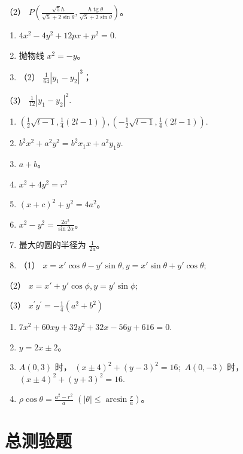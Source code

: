 （2）
\(P\left(\frac{\sqrt{5} h}{\sqrt{5} + 2\sin\theta}, \frac{h \operatorname{tg}\theta}{\sqrt{5} + 2\sin\theta}\right)\)。

\begin{enumerate}
\def\labelenumi{\arabic{enumi}.}
\setcounter{enumi}{5}
\item
  \(4x^{2} - 4y^{2} + 12px + p^{2} = 0.\)
\item
  抛物线 \(x^{2} = -y\)。
\item
  （2） \(\frac{1}{64} |y_1 - y_2|^3\)；
\end{enumerate}

（3） \(\frac{1}{12} |y_1 - y_2|^2.\)

\begin{enumerate}
\def\labelenumi{\arabic{enumi}.}
\setcounter{enumi}{10}
\item
  \(\left(\frac{1}{2}\sqrt{l - 1},\frac{1}{4}(2l - 1)\right),\left(-\frac{1}{2}\sqrt{l - 1},\frac{1}{4}(2l - 1)\right).\)
\item
  \(b^{2}x^{2} + a^{2}y^{2} = b^{2}x_{1}x + a^{2}y_{1}y.\)
\item
  \(a + b\)。
\item
  \(x^{2} + 4y^{2} = r^{2}\)
\item
  \((x + c)^2 + y^2 = 4a^2\)。
\item
  \(x^{2} - y^{2} = \frac{2a^{2}}{\sin 2\alpha}\)。
\item
  最大的圆的半径为 \(\frac{1}{2a}\)。
\item
  （1）
  \(x = x' \cos \theta - y' \sin \theta, y = x' \sin \theta + y' \cos \theta;\)
\end{enumerate}

（2） \(x = x' + y'\cos \phi, y = y'\sin \phi;\)

（3） \(x^{\prime}y^{\prime} = -\frac{1}{4} (a^{2} + b^{2})\)

\begin{enumerate}
\def\labelenumi{\arabic{enumi}.}
\setcounter{enumi}{23}
\item
  \(7x^{2} + 60xy + 32y^{2} + 32x - 56y + 616 = 0.\)
\item
  \(y = 2x \pm 2\)。
\item
  \(A(0,3)\) 时， \((x\pm 4)^{2} + (y - 3)^{2} = 16;\) \(A(0, -3)\) 时，
  \((x\pm 4)^{2} + (y + 3)^{2} = 16.\)
\item
  \(\rho \cos \theta = \frac{a^2 - r^2}{a}\)
  \(\left(|\theta| \leqslant \arcsin \frac{r}{a}\right)\)。
\end{enumerate}

\section{总测验题}\label{ux603bux6d4bux9a8cux9898-1}

